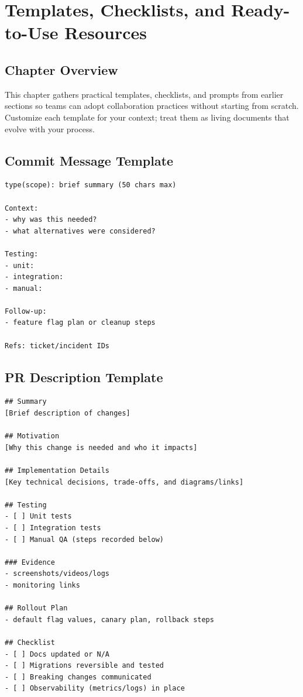 \chapter{Templates, Checklists, and Ready-to-Use Resources}

\section{Chapter Overview}
This chapter gathers practical templates, checklists, and prompts from earlier sections so teams can adopt collaboration practices without starting from scratch. Customize each template for your context; treat them as living documents that evolve with your process.

\section{Commit Message Template}
\begin{lstlisting}[style=shell]
type(scope): brief summary (50 chars max)

Context:
- why was this needed?
- what alternatives were considered?

Testing:
- unit:
- integration:
- manual:

Follow-up:
- feature flag plan or cleanup steps

Refs: ticket/incident IDs
\end{lstlisting}

\section{PR Description Template}
\begin{lstlisting}[style=markdown]
## Summary
[Brief description of changes]

## Motivation
[Why this change is needed and who it impacts]

## Implementation Details
[Key technical decisions, trade-offs, and diagrams/links]

## Testing
- [ ] Unit tests
- [ ] Integration tests
- [ ] Manual QA (steps recorded below)

### Evidence
- screenshots/videos/logs
- monitoring links

## Rollout Plan
- default flag values, canary plan, rollback steps

## Checklist
- [ ] Docs updated or N/A
- [ ] Migrations reversible and tested
- [ ] Breaking changes communicated
- [ ] Observability (metrics/logs) in place
\end{lstlisting}

